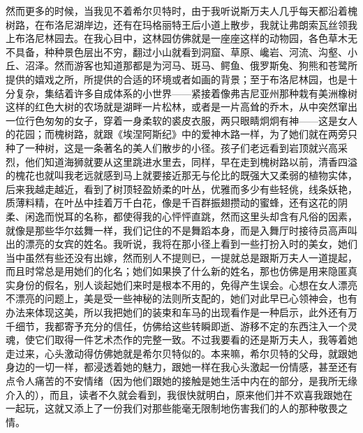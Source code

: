 \par 然而更多的时候，当我见不着希尔贝特时，由于我听说斯万夫人几乎每天都沿着槐树路，在布洛尼湖岸边，还有在玛格丽特王后小道上散步，我就让弗朗索瓦丝领我上布洛尼林园去。在我心目中，这林园仿佛就是一座座这样的动物园，各色草木无不具备，种种景色层出不穷，翻过小山就看到洞窟、草原、巉岩、河流、沟壑、小丘、沼泽。然而游客也知道那都是为河马、斑马、鳄鱼、俄罗斯兔、狗熊和苍鹭所提供的嬉戏之所，所提供的合适的环境或者如画的背景；至于布洛尼林园，也是十分复杂，集结着许多自成体系的小世界——紧接着像弗吉尼亚州那种栽有美洲橡树这样的红色大树的农场就是湖畔一片松林，或者是一片高耸的乔木，从中突然窜出一位行色匆匆的女子，穿着一身柔软的裘皮衣服，两只眼睛炯炯有神——这是女人的花园；而槐树路，就跟《埃涅阿斯纪》中的爱神木路一样，为了她们就在两旁只种了一种树，这是一条著名的美人们散步的小径。孩子们老远看到岩顶就兴高采烈，他们知道海狮就要从这里跳进水里去，同样，早在走到槐树路以前，清香四溢的槐花也就叫我老远就感到马上就要接近那无与伦比的既强大又柔弱的植物实体，后来我越走越近，看到了树顶轻盈娇柔的叶丛，优雅而多少有些轻佻，线条妖艳，质薄料精，在叶丛中挂着万千白花，像是千百群振翅攒动的蜜蜂，还有这花的阴柔、闲逸而悦耳的名称，都使得我的心怦怦直跳，然而这里头却含有凡俗的因素，就像是那些华尔兹舞一样，我们记住的不是舞蹈本身，而是入舞厅时接待员高声叫出的漂亮的女宾的姓名。我听说，我将在那小径上看到一些打扮入时的美女，她们当中虽然有些还没有出嫁，然而别人不提则已，一提就总是跟斯万夫人一道提起，而且时常总是用她们的化名；她们如果换了什么新的姓名，那也仿佛是用来隐匿真实身份的假名，别人谈起她们来时是根本不用的，免得产生误会。心想在女人漂亮不漂亮的问题上，美是受一些神秘的法则所支配的，她们对此早已心领神会，也有办法来体现这美，所以我把她们的装束和车马的出现看作是一种启示，此外还有万千细节，我都寄予充分的信任，仿佛给这些转瞬即逝、游移不定的东西注入一个灵魂，使它们取得一件艺术杰作的完整一致。不过我要看的还是斯万夫人，我等着她走过来，心头激动得仿佛她就是希尔贝特似的。本来嘛，希尔贝特的父母，就跟她身边的一切一样，都浸透着她的魅力，跟她一样在我心头激起一份情感，甚至还有点令人痛苦的不安情绪（因为他们跟她的接触是她生活中内在的部分，是我所无缘介入的），而且，读者不久就会看到，我很快就明白，原来他们并不欢喜我跟她在一起玩，这就又添上了一份我们对那些能毫无限制地伤害我们的人的那种敬畏之情。
